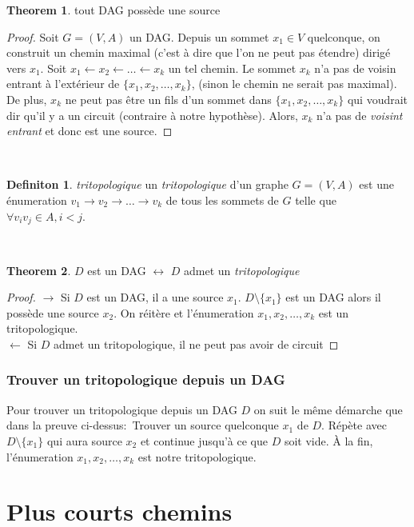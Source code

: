 \documentclass[french]{article}
\theoremstyle{definition}
\newtheorem{definition}{Definiton}[subsection]
\newtheorem{theorem}{Theorem}[section]
\begin{document}
		\begin{theorem}{tout DAG possède une source}
			\begin{proof}
				Soit $G = (V, A)$ un DAG. Depuis un sommet $x_1 \in V$ quelconque, on construit un chemin maximal (c'est à dire que l'on ne peut pas étendre) dirigé vers $x_1$. Soit $x_1 \leftarrow x_2 \leftarrow \dots \leftarrow x_k$ un tel chemin. Le sommet $x_k$ n'a pas de voisin entrant à l'extérieur de $\{x_1, x_2, \dots , x_k\}$, (sinon le chemin ne serait pas maximal). De plus, $x_k$ ne peut pas être un fils d'un sommet dans $\{x_1, x_2, \dots , x_k\}$ qui voudrait dir qu'il y a un circuit (contraire à notre hypothèse). Alors, $x_k$ n'a pas de \textit{voisint entrant} et donc est une source.
			\end{proof}
		\end{theorem}
		\
		\begin{definition}{\textit{tritopologique}}
			un \textit{tritopologique} d'un graphe $G = (V, A)$ est une énumeration $v_1 \to v_2 \to \dots \to v_k$ de tous les sommets de $G$ telle que $\forall v_iv_j \in A, i < j$.
		\end{definition}
		\
		\begin{theorem}{$D$ est un DAG $\leftrightarrow$ $D$ admet un \textit{tritopologique}}
			\begin{proof}
				$\to$ Si $D$ est un DAG, il a une source $x_1$. $D \setminus \{x_1\}$ est un DAG alors il possède une source $x_2$. On réitère et l'énumeration $x_1, x_2, \dots, x_k$ est un tritopologique.
				\\
				$\leftarrow$ Si $D$ admet un tritopologique, il ne peut pas avoir de circuit
			\end{proof}
		\end{theorem}
		
		\subsubsection{Trouver un tritopologique depuis un DAG}
		Pour trouver un tritopologique depuis un DAG $D$ on suit le même démarche que dans la preuve ci-dessus:\
		Trouver un source quelconque $x_1$ de $D$. Répète avec $D \setminus \{x_1\}$ qui aura source $x_2$ et continue jusqu'à ce que $D$ soit vide. À la fin, l'énumeration $x_1, x_2, \dots,x_k$ est notre tritopologique.

		\section{Plus courts chemins}
\end{document}

